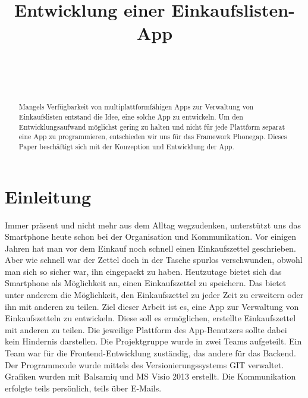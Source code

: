\documentclass[10pt, conference, compsocconf]{IEEEtran}
\begin{document}
\title{Entwicklung einer Einkaufslisten-App}


\author{
\\
\and
{}
\\
}

\maketitle


\begin{abstract}
Mangels Verf\"ugbarkeit von multiplattformf\"ahigen Apps zur Verwaltung von Einkaufslisten entstand die Idee, eine solche App zu entwickeln. Um den Entwicklungsaufwand m\"oglichst gering zu halten und nicht f\"ur jede Plattform separat eine App zu programmieren, entschieden wir uns f\"ur das Framework Phonegap. Dieses Paper besch\"aftigt sich mit der Konzeption und Entwicklung der App.   
\end{abstract}

\IEEEpeerreviewmaketitle

\section{Einleitung}
Immer pr\"asent und nicht mehr aus dem Alltag wegzudenken, unterst\"utzt  uns das Smartphone heute schon bei der Organisation und Kommunikation. Vor einigen Jahren hat man vor dem Einkauf noch schnell einen Einkaufszettel geschrieben. Aber wie schnell war der Zettel doch in der Tasche spurlos verschwunden, obwohl man sich so sicher war, ihn eingepackt zu haben. Heutzutage bietet sich das Smartphone als M\"oglichkeit an, einen Einkaufszettel zu speichern. Das bietet unter anderem die M\"oglichkeit, den Einkaufszettel zu jeder Zeit zu erweitern oder ihn mit anderen zu teilen. 
Ziel dieser Arbeit ist es, eine App zur Verwaltung von Einkaufszetteln zu entwickeln.
Diese soll es erm\"oglichen, erstellte Einkaufszettel mit anderen zu teilen.
Die jeweilige Plattform des App-Benutzers sollte dabei kein Hindernis darstellen.
Die Projektgruppe wurde in zwei Teams aufgeteilt. 
Ein Team war f\"ur die Frontend-Entwicklung zust\"andig, das andere f\"ur das Backend. 
Der Programmcode wurde mittels des Versionierungssystems GIT verwaltet. 
Grafiken wurden mit Balsamiq und MS Visio 2013 erstellt. 
Die Kommunikation erfolgte teils pers\"onlich, teils \"uber E-Mails.
\end{document}
